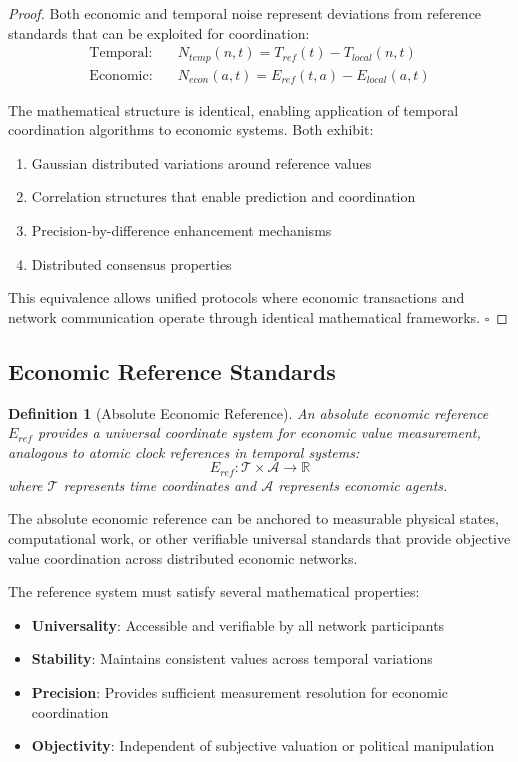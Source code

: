 \documentclass[12pt,a4paper]{article}
\newtheorem{definition}[theorem]{Definition}
\begin{document}
\begin{proof}
Both economic and temporal noise represent deviations from reference standards that can be exploited for coordination:
\begin{align}
\text{Temporal:} \quad &N_{temp}(n,t) = T_{ref}(t) - T_{local}(n,t) \\
\text{Economic:} \quad &N_{econ}(a,t) = E_{ref}(t,a) - E_{local}(a,t)
\end{align}

The mathematical structure is identical, enabling application of temporal coordination algorithms to economic systems. Both exhibit:
\begin{enumerate}
\item Gaussian distributed variations around reference values
\item Correlation structures that enable prediction and coordination
\item Precision-by-difference enhancement mechanisms
\item Distributed consensus properties
\end{enumerate}

This equivalence allows unified protocols where economic transactions and network communication operate through identical mathematical frameworks. $\square$
\end{proof}

\subsection{Economic Reference Standards}

\begin{definition}[Absolute Economic Reference]
An absolute economic reference $E_{ref}$ provides a universal coordinate system for economic value measurement, analogous to atomic clock references in temporal systems:
\begin{equation}
E_{ref}: \mathcal{T} \times \mathcal{A} \rightarrow \mathbb{R}
\end{equation}
where $\mathcal{T}$ represents time coordinates and $\mathcal{A}$ represents economic agents.
\end{definition}

The absolute economic reference can be anchored to measurable physical states, computational work, or other verifiable universal standards that provide objective value coordination across distributed economic networks.

The reference system must satisfy several mathematical properties:
\begin{itemize}
\item \textbf{Universality}: Accessible and verifiable by all network participants
\item \textbf{Stability}: Maintains consistent values across temporal variations
\item \textbf{Precision}: Provides sufficient measurement resolution for economic coordination
\item \textbf{Objectivity}: Independent of subjective valuation or political manipulation
\end{itemize}
\end{document}
